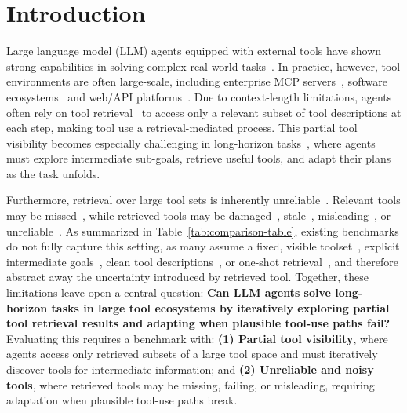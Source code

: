 \section{Introduction}



Large language model (LLM) agents equipped with external tools have shown strong capabilities in solving complex real-world tasks~\citep{ToolRL, Code2Math}. 
In practice, however, tool environments are often large-scale, including enterprise MCP servers~\citep{MCP, MCP-Bench}, software ecosystems~\citep{APIBench} and web/API platforms~\citep{ToolBench}. 
Due to context-length limitations, agents often rely on tool retrieval~\citep{ToolGen, ToolRet} to access only a relevant subset of tool descriptions at each step, making tool use a retrieval-mediated process.
This partial tool visibility becomes especially challenging in long-horizon tasks~\citep{SELFGOAL, EscapeBench}, where agents must explore intermediate sub-goals, retrieve useful tools, and adapt their plans as the task unfolds.



Furthermore, retrieval over large tool sets is inherently unreliable~\citep{Tool-Retrieval-is-not-reliable-1}. 
Relevant tools may be missed~\citep{COLT}, while retrieved tools may be damaged~\citep{OpaqueToolsBench}, stale~\citep{ToolQA-D}, misleading~\citep{TRUSTDESC}, or unreliable~\citep{ToolSandbox}. 
As summarized in Table~\ref{tab:comparison-table}, existing benchmarks do not fully capture this setting, as many assume a fixed, visible toolset~\citep{AppWorld}, explicit intermediate goals~\citep{ToolHop}, clean tool descriptions~\citep{OpaqueToolsBench}, or one-shot retrieval~\citep{ToolBench}, and therefore abstract away the uncertainty introduced by retrieved tool.
Together, these limitations leave open a central question: \textbf{Can LLM agents solve long-horizon tasks in large tool ecosystems by iteratively exploring partial tool retrieval results and adapting when plausible tool-use paths fail?} 
Evaluating this requires a benchmark with:
\textbf{(1) Partial tool visibility}, where agents access only retrieved subsets of a large tool space and must iteratively discover tools for intermediate information; and
\textbf{(2) Unreliable and noisy tools}, where retrieved tools may be missing, failing, or misleading, requiring adaptation when plausible tool-use paths break.


